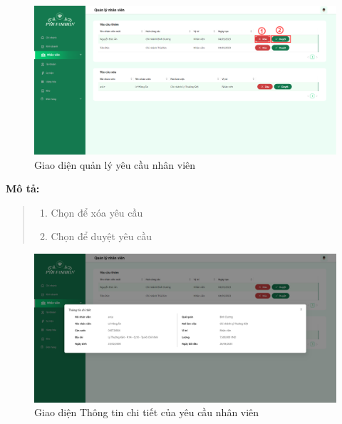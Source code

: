 \begin{figure}[!htp]
    \centering
    \includegraphics[width=12cm]{img/UI/admin_implement/staffRequest.png}
    \newline
    \caption{Giao diện quản lý yêu cầu nhân viên}
\end{figure}
\textbf{Mô tả:}
\begin{quote}
    \begin{enumerate}
        \item Chọn để xóa yêu cầu
        \item Chọn để duyệt yêu cầu
    \end{enumerate}
\end{quote}

\begin{figure}[!htp]
    \centering
    \includegraphics[width=12cm]{img/UI/admin_implement/staffRequestDetail.png}
    \newline
    \caption{Giao diện Thông tin chi tiết của yêu cầu nhân viên}
\end{figure}


\newpage

